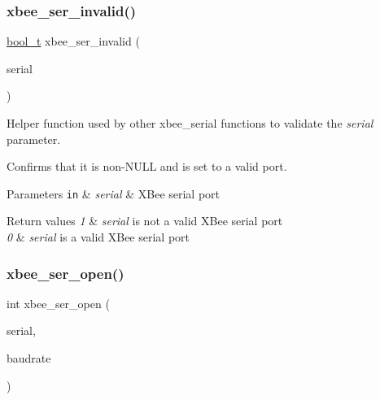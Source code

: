 \subsubsection{\texorpdfstring{xbee\+\_\+ser\+\_\+invalid()}{xbee\_ser\_invalid()}}
{\footnotesize\ttfamily \hyperlink{group__hal__dos_ga04dd5074964518403bf944f2b240a5f8}{bool\+\_\+t} xbee\+\_\+ser\+\_\+invalid (\begin{DoxyParamCaption}\item[{\hyperlink{structxbee__serial__t}{xbee\+\_\+serial\+\_\+t} $\ast$}]{serial }\end{DoxyParamCaption})}



Helper function used by other xbee\+\_\+serial functions to validate the {\itshape serial} parameter. 

Confirms that it is non-\/{\ttfamily N\+U\+LL} and is set to a valid port.


\begin{DoxyParams}[1]{Parameters}
\mbox{\tt in}  & {\em serial} & X\+Bee serial port\\
\hline
\end{DoxyParams}

\begin{DoxyRetVals}{Return values}
{\em 1} & {\itshape serial} is not a valid X\+Bee serial port \\
\hline
{\em 0} & {\itshape serial} is a valid X\+Bee serial port \\
\hline
\end{DoxyRetVals}
\mbox{\label{group__hal__hcs08_gaa615a221dd69c17ee2989c281f2bf04a}} 
\subsubsection{\texorpdfstring{xbee\+\_\+ser\+\_\+open()}{xbee\_ser\_open()}}
{\footnotesize\ttfamily int xbee\+\_\+ser\+\_\+open (\begin{DoxyParamCaption}\item[{\hyperlink{structxbee__serial__t}{xbee\+\_\+serial\+\_\+t} $\ast$}]{serial,  }\item[{\hyperlink{group__hal__dos_ga09a1e304d66d35dd47daffee9731edaa}{uint32\+\_\+t}}]{baudrate }\end{DoxyParamCaption})}




